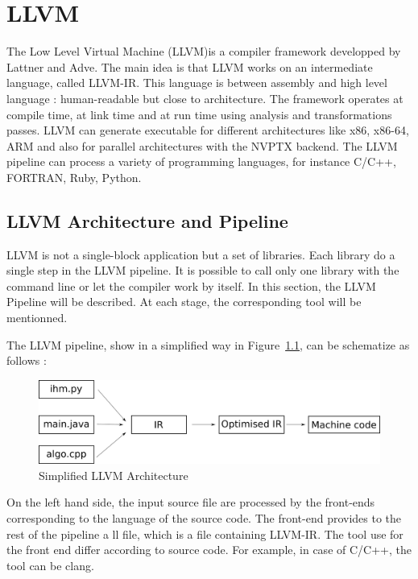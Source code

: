 \chapter{LLVM}\label{ch:LLVM}

The Low Level Virtual Machine (LLVM)is a compiler framework developped by Lattner and Adve\cite{LLVM}. The main idea is that LLVM works on an intermediate language, called LLVM-IR. This language is between assembly and high level language : human-readable but close to architecture. The framework operates at compile time, at link time and at run time using analysis and transformations passes. LLVM can generate executable for different architectures like x86, x86-64, ARM and also for parallel architectures with the NVPTX backend. The LLVM pipeline can process a variety of programming languages, for instance C/C++, FORTRAN, Ruby, Python. 

\section{LLVM Architecture and Pipeline}
LLVM is not a single-block application but a set of libraries. Each library do a single step in the LLVM pipeline. It is possible to call only one library with the command line or let the compiler work by itself. In this section, the LLVM Pipeline will be described. At each stage, the corresponding tool will be mentionned.

The LLVM pipeline, show in a simplified way in Figure~\ref{fig:Architecture}, can be schematize as follows :

\begin{figure}
\centering
\includegraphics[scale=0.25]{gfx/LLVM/Architecture.png}
\caption{Simplified LLVM Architecture}
\label{fig:Architecture}
\end{figure}

On the left hand side, the input source file are processed by the front-ends corresponding to the language of the source code. The front-end provides to the rest of the pipeline a ll file, which is a file containing LLVM-IR. The tool use for the front end differ according to source code. For example, in case of C/C++, the tool can be clang.

